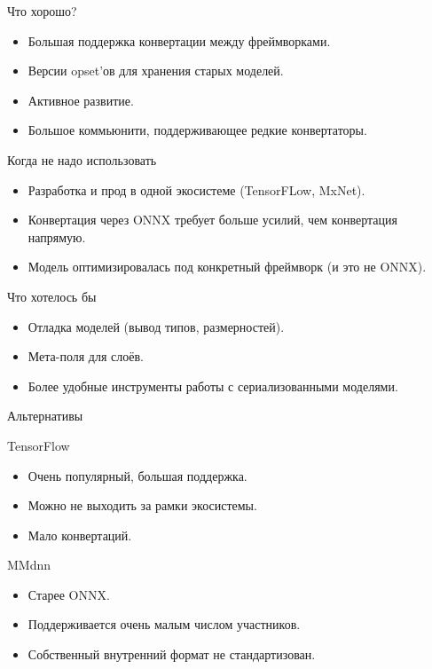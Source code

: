 \documentclass[mathserif,serif,unicode]{beamer}
\begin{document}
\begin{frame}{Что хорошо?}
    \begin{itemize}
        \item Большая поддержка конвертации между фреймворками.
        \item Версии opset'ов для хранения старых моделей.
        \item Активное развитие.
        \item Большое коммьюнити, поддерживающее редкие конвертаторы.
    \end{itemize}
\end{frame}

\begin{frame}{Когда не надо использовать}

\begin{itemize}
    \item Разработка и прод в одной экосистеме (TensorFLow, MxNet).
    \item Конвертация через ONNX требует больше усилий, чем конвертация напрямую.
    \item Модель оптимизировалась под конкретный фреймворк (и это не ONNX).
\end{itemize}
    
\end{frame}

\begin{frame}{Что хотелось бы}

\begin{itemize}
    \item Отладка моделей (вывод типов, размерностей).
    \item Мета-поля для слоёв.
    \item Более удобные инструменты работы с сериализованными моделями.
\end{itemize}
    
\end{frame}

\begin{frame}{Альтернативы}

    TensorFlow
    \begin{itemize}
        \item Очень популярный, большая поддержка.
        \item Можно не выходить за рамки экосистемы.
        \item Мало конвертаций.
    \end{itemize}
\vspace{5mm}
    MMdnn
    \begin{itemize}
        \item Старее ONNX.
        \item Поддерживается очень малым числом участников.
        \item Собственный внутренний формат не стандартизован.
    \end{itemize}
\end{frame}
\end{document}
